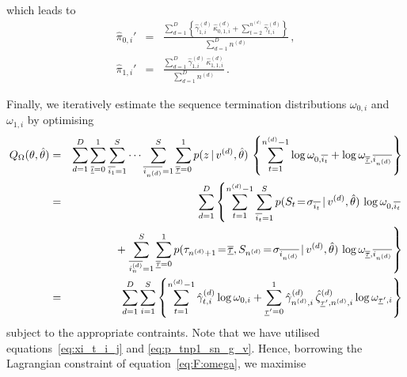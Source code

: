 \documentclass[a4paper]{article}
\newcommand{\ui}{\underline{\iota}}
\newcommand{\ut}{\underline{\tau}}
\begin{document}
which leads to
\begin{eqnarray}
\hat{\pi}_{0,i}' & = & 
  \frac{\sum_{d=1}^D\left\{\hat{\gamma}^{(d)}_{1,i}\,\hat{\kappa}^{(d)}_{0,1,i}+\sum_{t=2}^{n^{(d)}}\hat{\gamma}^{(d)}_{t,i}\right\}}
          {\sum_{d=1}^D n^{(d)}}\,,
\nonumber\\
\hat{\pi}_{1,i}' & = & 
  \frac{\sum_{d=1}^D\hat{\gamma}^{(d)}_{1,i}\,\hat{\kappa}^{(d)}_{1,1,i}}
          {\sum_{d=1}^D n^{(d)}}\,.
\end{eqnarray}

Finally, we iteratively estimate the sequence termination distributions $\omega_{0,i}$ and $\omega_{1,i}$ by optimising
\begin{eqnarray}
  Q_{\Omega}(\theta,\hat{\theta}) & = & 
\sum_{d=1}^D
\sum_{\overline{\ui}=0}^{1}\sum_{\overline{i_1}=1}^{S}\cdots\sum_{\overline{i_{n^{(d)}}}=1}^{S}
\sum_{\overline{\ut}=0}^{1}
p(z\,|\,v^{(d)},\hat{\theta})\,
\left\{\sum_{t=1}^{n^{(d)}-1}\log\omega_{0,\overline{i_t}}+\log\omega_{\overline{\ut},\overline{i_{n^{(d)}}}}\right\}
\nonumber\\& = &
\sum_{d=1}^D\left\{\sum_{t=1}^{n^{(d)}-1}\sum_{\overline{i_t}=1}^{S}
p(S_t\!=\!\sigma_{\overline{i_t}}\,|\,v^{(d)},\hat{\theta})\,
\log\omega_{0,\overline{i_t}}\right.
\nonumber\\&&\hspace*{10mm}
+\left.\sum_{\overline{i_n^{(d)}}=1}^{S}
\sum_{\overline{\ut}=0}^{1}
p(\tau_{n^{(d)}+1}\!=\!\overline{\ut},S_{n^{(d)}}\!=\!\sigma_{\overline{i_{n^{(d)}}}}\,|\,v^{(d)},\hat{\theta})\,
\log\omega_{\overline{\ut},\overline{i_{n^{(d)}}}}\right\}
\nonumber\\& = &
\sum_{d=1}^D\sum_{i=1}^{S}\left\{
\sum_{t=1}^{n^{(d)}-1}
\hat{\gamma}_{t,i}^{(d)}\log\omega_{0,i}+
\sum_{\ut'=0}^{1}
\hat{\gamma}^{(d)}_{n^{(d)},i}\,\hat{\zeta}_{\ut',n^{(d)},i}^{(d)}\log\omega_{\ut',i}
\right\}
\end{eqnarray}
subject to the appropriate contraints. Note that we have utilised equations~\eqref{eq:xi_t_i_j} and \eqref{eq:p_tnp1_sn_g_v}.
Hence, borrowing the Lagrangian constraint of equation~\eqref{eq:F:omega}, we maximise
\end{document}
